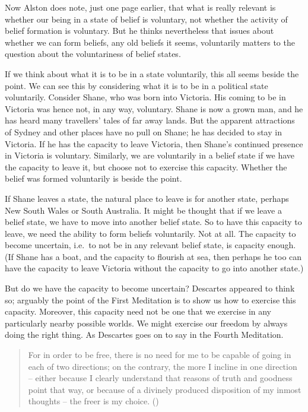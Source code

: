 \documentclass[
  11pt,
  letterpaper,
  DIV=11,
  numbers=noendperiod,
  oneside]{scrartcl}
\begin{document}
Now Alston does note, just one page earlier, that what is really
relevant is whether our being in a state of belief is voluntary, not
whether the activity of belief formation is voluntary. But he thinks
nevertheless that issues about whether we can form beliefs, any old
beliefs it seems, voluntarily matters to the question about the
voluntariness of belief states.

If we think about what it is to be in a state voluntarily, this all
seems beside the point. We can see this by considering what it is to be
in a political state voluntarily. Consider Shane, who was born into
Victoria. His coming to be in Victoria was hence not, in any way,
voluntary. Shane is now a grown man, and he has heard many travellers'
tales of far away lands. But the apparent attractions of Sydney and
other places have no pull on Shane; he has decided to stay in Victoria.
If he has the capacity to leave Victoria, then Shane's continued
presence in Victoria is voluntary. Similarly, we are voluntarily in a
belief state if we have the capacity to leave it, but choose not to
exercise this capacity. Whether the belief was formed voluntarily is
beside the point.

If Shane leaves a state, the natural place to leave is for another
state, perhaps New South Wales or South Australia. It might be thought
that if we leave a belief state, we have to move into another belief
state. So to have this capacity to leave, we need the ability to form
beliefs voluntarily. Not at all. The capacity to become uncertain,
i.e.~to not be in any relevant belief state, is capacity enough. (If
Shane has a boat, and the capacity to flourish at sea, then perhaps he
too can have the capacity to leave Victoria without the capacity to go
into another state.)

But do we have the capacity to become uncertain? Descartes appeared to
think so; arguably the point of the First Meditation is to show us how
to exercise this capacity. Moreover, this capacity need not be one that
we exercise in any particularly nearby possible worlds. We might
exercise our freedom by always doing the right thing. As Descartes goes
on to say in the Fourth Meditation.

\begin{quote}
For in order to be free, there is no need for me to be capable of going
in each of two directions; on the contrary, the more I incline in one
direction -- either because I clearly understand that reasons of truth
and goodness point that way, or because of a divinely produced
disposition of my inmost thoughts -- the freer is my choice.
()
\end{quote}
\end{document}
